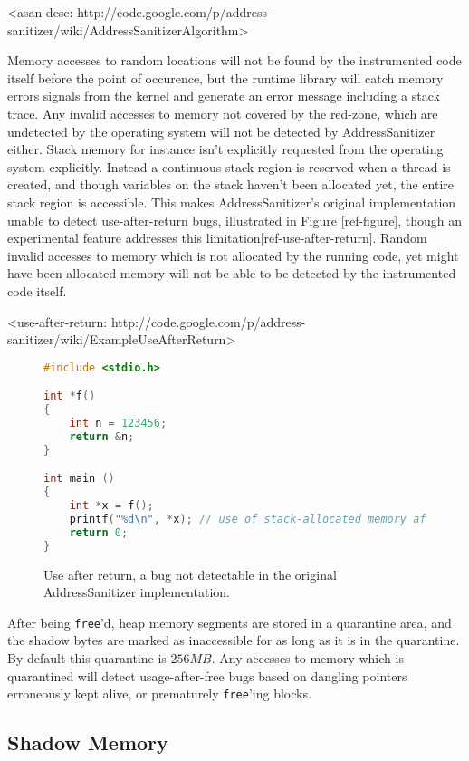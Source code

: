 <asan-desc: http://code.google.com/p/address-sanitizer/wiki/AddressSanitizerAlgorithm>

\noindent Memory accesses to random locations will not be found by the
instrumented code itself before the point of occurence, but the runtime library
will catch memory errors signals from the kernel and generate an error message
including a stack trace.
Any invalid accesses to memory not covered by the red-zone, which are undetected
by the operating system will not be detected by AddressSanitizer either.
Stack memory for instance isn't explicitly requested from the operating system
explicitly.
Instead a continuous stack region is reserved when a thread is created, and
though variables on the stack haven't been allocated yet, the entire stack
region is accessible.
This makes AddressSanitizer's original implementation unable to detect
use-after-return bugs, illustrated in Figure [ref-figure], though an
experimental feature addresses this limitation[ref-use-after-return].
Random invalid accesses to memory which is not allocated by the running code,
yet might have been allocated memory will not be able to be detected by the
instrumented code itself.

<use-after-return: http://code.google.com/p/address-sanitizer/wiki/ExampleUseAfterReturn>

\begin{figure}[ht]
\begin{lstlisting}[language=C]
#include <stdio.h>

int *f()
{
    int n = 123456;
    return &n;
}

int main ()
{
    int *x = f();
    printf("%d\n", *x); // use of stack-allocated memory after return
    return 0;
}
\end{lstlisting}
\caption{Use after return, a bug not detectable in the original AddressSanitizer
implementation.}
\end{figure}

After being \texttt{free}'d, heap memory segments are stored in a quarantine
area, and the shadow bytes are marked as inaccessible for as long as it is in
the quarantine.
By default this quarantine is $256 MB$.
Any accesses to memory which is quarantined will detect usage-after-free bugs
based on dangling pointers erroneously kept alive, or prematurely
\texttt{free}'ing blocks.

\subsection {Shadow Memory}

